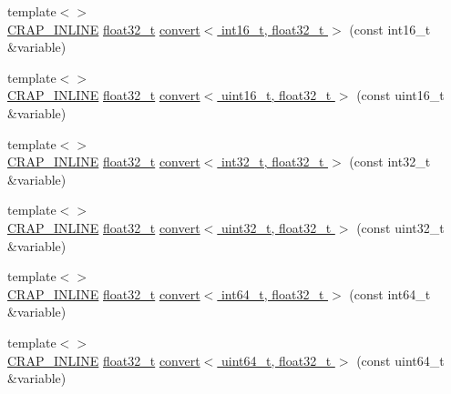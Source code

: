 \begin{DoxyCompactItemize}
\item 
{\footnotesize template$<$$>$ }\\\hyperlink{config__x86_8h_a5a40526b8d842e7ff731509998bb0f1c}{C\+R\+A\+P\+\_\+\+I\+N\+L\+I\+N\+E} \hyperlink{crap__types_8h_a4611b605e45ab401f02cab15c5e38715}{float32\+\_\+t} \hyperlink{namespacecrap_ac8bc01b88cd649bd3ff88dc867a6f35d}{convert$<$ int16\+\_\+t, float32\+\_\+t $>$} (const int16\+\_\+t \&variable)
\item 
{\footnotesize template$<$$>$ }\\\hyperlink{config__x86_8h_a5a40526b8d842e7ff731509998bb0f1c}{C\+R\+A\+P\+\_\+\+I\+N\+L\+I\+N\+E} \hyperlink{crap__types_8h_a4611b605e45ab401f02cab15c5e38715}{float32\+\_\+t} \hyperlink{namespacecrap_a3bb40e8042f8dc5ac2ef08f73603f266}{convert$<$ uint16\+\_\+t, float32\+\_\+t $>$} (const uint16\+\_\+t \&variable)
\item 
{\footnotesize template$<$$>$ }\\\hyperlink{config__x86_8h_a5a40526b8d842e7ff731509998bb0f1c}{C\+R\+A\+P\+\_\+\+I\+N\+L\+I\+N\+E} \hyperlink{crap__types_8h_a4611b605e45ab401f02cab15c5e38715}{float32\+\_\+t} \hyperlink{namespacecrap_a9066413e045407109d32581fd6d63ce5}{convert$<$ int32\+\_\+t, float32\+\_\+t $>$} (const int32\+\_\+t \&variable)
\item 
{\footnotesize template$<$$>$ }\\\hyperlink{config__x86_8h_a5a40526b8d842e7ff731509998bb0f1c}{C\+R\+A\+P\+\_\+\+I\+N\+L\+I\+N\+E} \hyperlink{crap__types_8h_a4611b605e45ab401f02cab15c5e38715}{float32\+\_\+t} \hyperlink{namespacecrap_a62dcdb36919875237e8a1cd3a137bf5a}{convert$<$ uint32\+\_\+t, float32\+\_\+t $>$} (const uint32\+\_\+t \&variable)
\item 
{\footnotesize template$<$$>$ }\\\hyperlink{config__x86_8h_a5a40526b8d842e7ff731509998bb0f1c}{C\+R\+A\+P\+\_\+\+I\+N\+L\+I\+N\+E} \hyperlink{crap__types_8h_a4611b605e45ab401f02cab15c5e38715}{float32\+\_\+t} \hyperlink{namespacecrap_a89d61e7168b4eb377351449a330f4fc3}{convert$<$ int64\+\_\+t, float32\+\_\+t $>$} (const int64\+\_\+t \&variable)
\item 
{\footnotesize template$<$$>$ }\\\hyperlink{config__x86_8h_a5a40526b8d842e7ff731509998bb0f1c}{C\+R\+A\+P\+\_\+\+I\+N\+L\+I\+N\+E} \hyperlink{crap__types_8h_a4611b605e45ab401f02cab15c5e38715}{float32\+\_\+t} \hyperlink{namespacecrap_a99c9d071b9f52a5ec23cc06825cfd011}{convert$<$ uint64\+\_\+t, float32\+\_\+t $>$} (const uint64\+\_\+t \&variable)
\item 

\end{DoxyCompactItemize}
